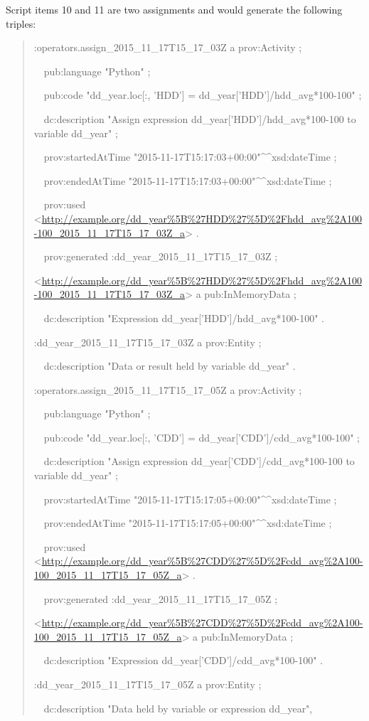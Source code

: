 Script items 10 and 11 are two assignments and would generate the following triples:
\begin{quotation}
	\noindent:operators.assign\_2015\_11\_17T15\_17\_03Z a prov:Activity ;
	
	\noindent\ \ pub:language "Python" ;
	
	\noindent\ \ pub:code "dd\_year.loc[:, 'HDD'] = dd\_year['HDD']/hdd\_avg*100-100" ;
	
	\noindent\ \ dc:description "Assign expression dd\_year['HDD']/hdd\_avg*100-100 to variable dd\_year" ;
	
	\noindent\ \ prov:startedAtTime "2015-11-17T15:17:03+00:00"\^{}\^{}xsd:dateTime ;
	
	\noindent\ \ prov:endedAtTime "2015-11-17T15:17:03+00:00"\^{}\^{}xsd:dateTime ;
	
	\noindent\ \ prov:used <\url{http://example.org/dd_year%5B%27HDD%27%5D%2Fhdd_avg%2A100-100_2015_11_17T15_17_03Z_a}> .
		
	\noindent\ \ prov:generated :dd\_year\_2015\_11\_17T15\_17\_03Z ;
	
	\noindent<\url{http://example.org/dd_year%5B%27HDD%27%5D%2Fhdd_avg%2A100-100_2015_11_17T15_17_03Z_a}> a pub:InMemoryData ;
	
	\noindent\ \ dc:description "Expression dd\_year['HDD']/hdd\_avg*100-100" .
	
	\noindent:dd\_year\_2015\_11\_17T15\_17\_03Z a prov:Entity ;
	
	\noindent\ \ dc:description "Data or result held by variable dd\_year" .
	
	\noindent:operators.assign\_2015\_11\_17T15\_17\_05Z a prov:Activity ;
	
	\noindent\ \ pub:language "Python" ;
	
	\noindent\ \ pub:code "dd\_year.loc[:, 'CDD'] = dd\_year['CDD']/cdd\_avg*100-100" ;
	
	\noindent\ \ dc:description "Assign expression dd\_year['CDD']/cdd\_avg*100-100 to variable dd\_year" ;
	
	\noindent\ \ prov:startedAtTime "2015-11-17T15:17:05+00:00"\^{}\^{}xsd:dateTime ;
	
	\noindent\ \ prov:endedAtTime "2015-11-17T15:17:05+00:00"\^{}\^{}xsd:dateTime ;
	
	\noindent\ \ prov:used <\url{http://example.org/dd_year%5B%27CDD%27%5D%2Fcdd_avg%2A100-100_2015_11_17T15_17_05Z_a}> .
		
	\noindent\ \ prov:generated :dd\_year\_2015\_11\_17T15\_17\_05Z ;
	
	\noindent<\url{http://example.org/dd_year%5B%27CDD%27%5D%2Fcdd_avg%2A100-100_2015_11_17T15_17_05Z_a}> a pub:InMemoryData ;
	
	\noindent\ \ dc:description "Expression dd\_year['CDD']/cdd\_avg*100-100" .

	\noindent:dd\_year\_2015\_11\_17T15\_17\_05Z a prov:Entity ;
	
	\noindent\ \ dc:description "Data held by variable or expression dd\_year",
\end{quotation}

